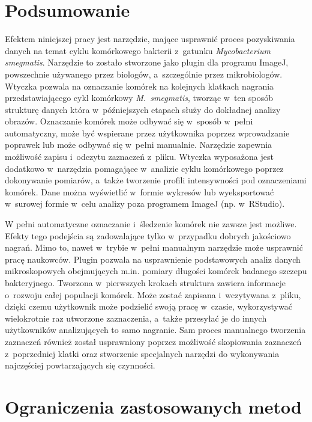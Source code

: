 \documentclass[declaration,shortabstract,mgr]{iithesis}
\begin{document}


\section{Podsumowanie}

Efektem niniejszej pracy jest narzędzie, mające usprawnić proces pozyskiwania danych na temat cyklu komórkowego bakterii z~gatunku \emph{Mycobacterium smegmatis}.
Narzędzie to zostało stworzone jako plugin dla programu ImageJ, powszechnie używanego przez biologów, a~szczególnie przez mikrobiologów.
Wtyczka pozwala na oznaczanie komórek na kolejnych klatkach nagrania przedstawiającego cykl komórkowy \emph{M.~smegmatis}, tworząc w~ten sposób strukturę danych która w~późniejszych etapach służy do dokładnej analizy obrazów.
Oznaczanie komórek może odbywać się w~sposób w~pełni automatyczny, może być wspierane przez użytkownika poprzez wprowadzanie poprawek lub może odbywać się w~pełni manualnie.
Narzędzie zapewnia możliwość zapisu i~odczytu zaznaczeń z~pliku.
Wtyczka wyposażona jest dodatkowo w~narzędzia pomagające w~analizie cyklu komórkowego poprzez dokonywanie pomiarów, a~także tworzenie profili intensywności pod oznaczeniami komórek.
Dane można wyświetlić w~formie wykresów lub wyeksportować w~surowej formie w~celu analizy poza programem ImageJ (np. w~RStudio).

W pełni automatyczne oznaczanie i~śledzenie komórek nie zawsze jest możliwe.
Efekty tego podejścia są zadowalające tylko w~przypadku dobrych jakościowo nagrań.
Mimo to, nawet w~trybie w~pełni manualnym narzędzie może usprawnić pracę naukowców.
Plugin pozwala na usprawnienie podstawowych analiz danych mikroskopowych obejmujących m.in. pomiary długości komórek badanego szczepu bakteryjnego.
Tworzona w~pierwszych krokach struktura zawiera informacje o~rozwoju całej populacji komórek.
Może zostać zapisana i~wczytywana z~pliku, dzięki czemu użytkownik może podzielić swoją pracę w~czasie, wykorzystywać wielokrotnie raz utworzone zaznaczenia, a~także przesyłać je do innych użytkowników analizujących to samo nagranie.
Sam proces manualnego tworzenia zaznaczeń również został usprawniony poprzez możliwość skopiowania zaznaczeń z~poprzedniej klatki oraz stworzenie specjalnych narzędzi do wykonywania najczęściej powtarzających się czynności.

\section{Ograniczenia zastosowanych metod}
\end{document}
